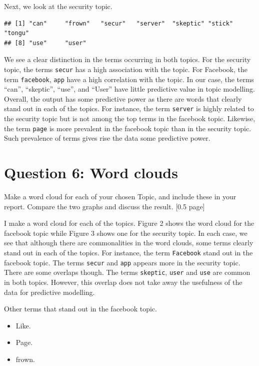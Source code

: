 \documentclass[
]{article}
\providecommand{\tightlist}{%
  \setlength{\itemsep}{0pt}\setlength{\parskip}{0pt}}
\begin{document}
Next, we look at the security topic.

\begin{verbatim}
## [1] "can"     "frown"   "secur"   "server"  "skeptic" "stick"   "tongu"  
## [8] "use"     "user"
\end{verbatim}

We see a clear distinction in the terms occurring in both topics. For
the security topic, the terms \texttt{secur} has a high association with
the topic. For Facebook, the term \texttt{facebook}, \texttt{app} have a
high correlation with the topic. In our case, the terms ``can'',
``skeptic'', ``use'', and ``User'' have little predictive value in topic
modelling. Overall, the output has some predictive power as there are
words that clearly stand out in each of the topics. For instance, the
term \texttt{server} is highly related to the security topic but is not
among the top terms in the facebook topic. Likewise, the term
\texttt{page} is more prevalent in the facebook topic than in the
security topic. Such prevalence of terms gives rise the data some
predictive power.

\hypertarget{question-6-word-clouds}{%
\section{\texorpdfstring{\textbf{Question 6: Word
clouds}}{Question 6: Word clouds}}\label{question-6-word-clouds}}

Make a word cloud for each of your chosen Topic, and include these in
your report. Compare the two graphs and discuss the result. {[}0.5
page{]}

I make a word cloud for each of the topics. Figure 2 shows the word
cloud for the facebook topic while Figure 3 shows one for the security
topic. In each case, we see that although there are commonalities in the
word clouds, some terms clearly stand out in each of the topics. For
instance, the term \texttt{Facebook} stand out in the facebook topic.
The terms \texttt{secur} and \texttt{app} appears more in the security
topic. There are some overlaps though. The terms \texttt{skeptic},
\texttt{user} and \texttt{use} are common in both topics. However, this
overlap does not take away the usefulness of the data for predictive
modelling.

Other terms that stand out in the facebook topic.

\begin{itemize}
\tightlist
\item
  Like.
\item
  Page.
\item
  frown.
\end{itemize}
\end{document}
